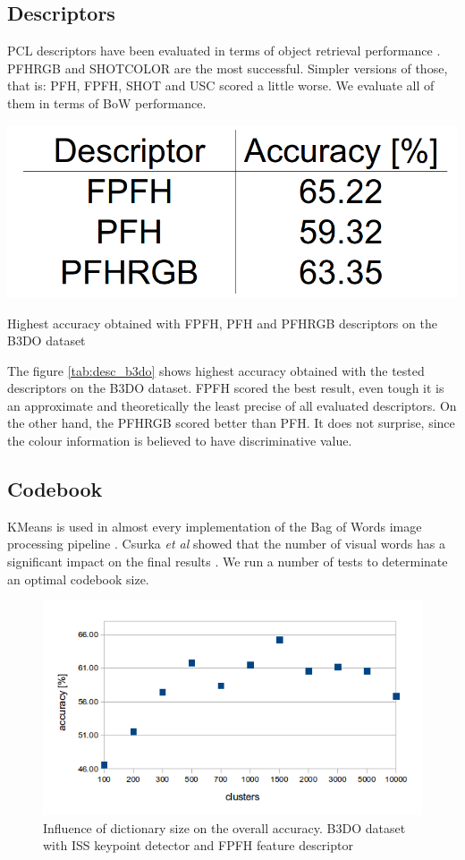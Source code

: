 	\subsection{Descriptors}
	PCL descriptors have been evaluated in terms of object retrieval performance \cite{pcl_features}. PFHRGB and SHOTCOLOR are the most successful. Simpler versions of those, that is: PFH, FPFH, SHOT and USC scored a little worse. We evaluate all of them in terms of BoW performance.
	
	\begin{table}[!ht]
	\centering	
	\includegraphics[width=.25\textwidth]{figs/desc_b3do}
	\caption{Highest accuracy obtained with FPFH, PFH and PFHRGB descriptors on the B3DO dataset}
	\label{tab:desc_b3do}
	\end{table}
	
	The figure \ref{tab:desc_b3do} shows highest accuracy obtained with the tested descriptors on the B3DO dataset. FPFH scored the best result, even tough it is an approximate and theoretically the least precise of all evaluated descriptors. On the other hand, the PFHRGB scored better than PFH. It does not surprise, since the colour information is believed to have discriminative value.
		
	\subsection{Codebook}
	KMeans is used in almost every implementation of the Bag of Words image processing pipeline \cite{tsai2012bag, toldo2009bag}. Csurka \emph{et al} showed that the number of visual words has a significant impact on the final results \cite{csurka2004visual}. We run a number of tests to determinate an optimal codebook size.
	
	\begin{figure}[!ht]
	\centering	
	\includegraphics[width=.75\textwidth]{figs/clustering_centroids_b3do}
	\caption{Influence of dictionary size on the overall accuracy. B3DO dataset with ISS keypoint detector and FPFH feature descriptor}
	\label{fig:cluster_b3do}
	\end{figure}
	
